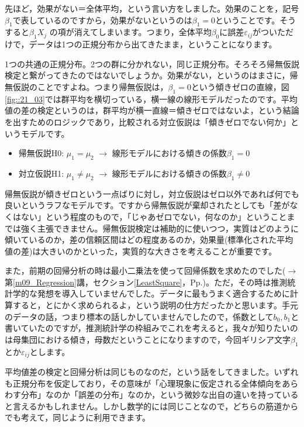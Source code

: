 \documentclass{ltjbook}
\begin{document}
先ほど，効果がない＝全体平均，という言い方をしました。効果のことを，記号$\beta_1$で表しているのですから，効果がないというのは$\beta_1=0$ということです。そうすると$\beta_1X_j$ の項が消えてしまいます。つまり，全体平均$\beta_0$に誤差$\varepsilon_{ij}$がついただけで，データは1つの正規分布から出てきたまま，ということになります。

1つの共通の正規分布。2つの群に分かれない，同じ正規分布。そろそろ帰無仮説検定と繋がってきたのではないでしょうか。効果がない，というのはまさに，帰無仮説のことですよね。つまり帰無仮説は，$\beta_1=0$という傾きゼロの直線，図\ref{fig::21_03}では群平均を横切っている，横一線の線形モデルだったのです。平均値の差の検定というのは，群平均が横一直線＝傾きゼロではないよ，という結論を出すためのロジックであり，比較される対立仮説は「傾きゼロでない何か」というモデルです。
\begin{itemize}
	\item 帰無仮説H0: $\mu_1 = \mu_2$ $\to$ 線形モデルにおける傾きの係数$\beta_1=0$
	\item 対立仮説H1: $\mu_1 \neq \mu_2$ $\to$ 線形モデルにおける傾きの係数$\beta_1\neq 0$
\end{itemize}
帰無仮説が傾きゼロという一点ばりに対し，対立仮説はゼロ以外であれば何でも良いというラフなモデルです。ですから帰無仮説が棄却されたとしても「差がなくはない」という程度のもので，「じゃあゼロでない，何なのか」ということまでは強く主張できません。帰無仮説検定は補助的に使いつつ，実質はどのように傾いているのか，差の信頼区間はどの程度あるのか，効果量(標準化された平均値の差)は大きいのかといった，実質的な大きさを考えることが重要です。

また，前期の回帰分析の時は最小二乗法を使って回帰係数を求めたのでした($\to$第\ref{m09_Regression}講，セクション\ref{LeastSquare}，Pp.\pageref{LeastSquare})。ただ，その時は推測統計学的な発想を導入していませんでした。データに最もうまく適合するために計算すると，とにかく求められるよ，という説明の仕方だったかと思います。手元のデータの話，つまり標本の話しかしていませんでしたので，係数として$b_0,b_1$と書いていたのですが，推測統計学の枠組みでこれを考えると，我々が知りたいのは母集団における傾き，母数だということになりますので，今回ギリシア文字$\beta_1$とか$\varepsilon_{ij}$とします。

平均値差の検定と回帰分析は同じものなのだ，という話をしてきました。いずれも正規分布を仮定しており，その意味が「心理現象に仮定される全体傾向をあらわす分布」なのか「誤差の分布」なのか，という微妙な出自の違いを持っていると言えるかもしれません。しかし数学的には同じことなので，どちらの筋道からでも考えて，同じように利用できます。
\end{document}
